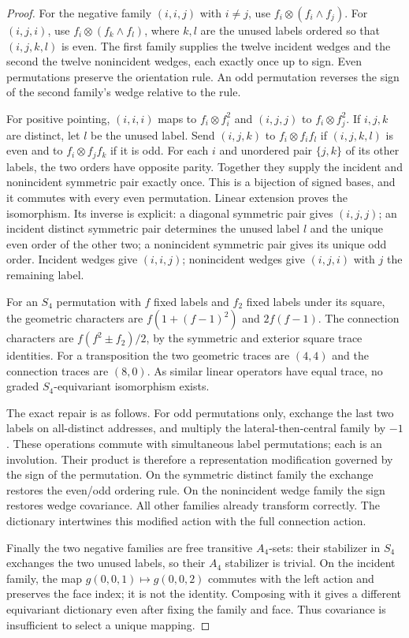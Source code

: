 \documentclass[10pt,a4paper,twocolumn]{article}
\begin{document}
\begin{proof}
For the negative family $(i,i,j)$ with $i\ne j$, use $f_i\otimes(f_i\wedge f_j)$. For $(i,j,i)$, use $f_i\otimes(f_k\wedge f_l)$, where $k,l$ are the unused labels ordered so that $(i,j,k,l)$ is even. The first family supplies the twelve incident wedges and the second the twelve nonincident wedges, each exactly once up to sign. Even permutations preserve the orientation rule. An odd permutation reverses the sign of the second family's wedge relative to the rule.

For positive pointing, $(i,i,i)$ maps to $f_i\otimes f_i^2$ and $(i,j,j)$ to $f_i\otimes f_j^2$. If $i,j,k$ are distinct, let $l$ be the unused label. Send $(i,j,k)$ to $f_i\otimes f_if_l$ if $(i,j,k,l)$ is even and to $f_i\otimes f_jf_k$ if it is odd. For each $i$ and unordered pair $\{j,k\}$ of its other labels, the two orders have opposite parity. Together they supply the incident and nonincident symmetric pair exactly once. This is a bijection of signed bases, and it commutes with every even permutation. Linear extension proves the isomorphism. Its inverse is explicit: a diagonal symmetric pair gives $(i,j,j)$; an incident distinct symmetric pair determines the unused label $l$ and the unique even order of the other two; a nonincident symmetric pair gives its unique odd order. Incident wedges give $(i,i,j)$; nonincident wedges give $(i,j,i)$ with $j$ the remaining label.

For an $S_4$ permutation with $f$ fixed labels and $f_2$ fixed labels under its square, the geometric characters are $f(1+(f-1)^2)$ and $2f(f-1)$. The connection characters are $f(f^2\pm f_2)/2$, by the symmetric and exterior square trace identities. For a transposition the two geometric traces are $(4,4)$ and the connection traces are $(8,0)$. As similar linear operators have equal trace, no graded $S_4$-equivariant isomorphism exists.

The exact repair is as follows. For odd permutations only, exchange the last two labels on all-distinct addresses, and multiply the lateral-then-central family by $-1$. These operations commute with simultaneous label permutations; each is an involution. Their product is therefore a representation modification governed by the sign of the permutation. On the symmetric distinct family the exchange restores the even/odd ordering rule. On the nonincident wedge family the sign restores wedge covariance. All other families already transform correctly. The dictionary intertwines this modified action with the full connection action.

Finally the two negative families are free transitive $A_4$-sets: their stabilizer in $S_4$ exchanges the two unused labels, so their $A_4$ stabilizer is trivial. On the incident family, the map $g(0,0,1)\mapsto g(0,0,2)$ commutes with the left action and preserves the face index; it is not the identity. Composing with it gives a different equivariant dictionary even after fixing the family and face. Thus covariance is insufficient to select a unique mapping.
\end{proof}
\end{document}

